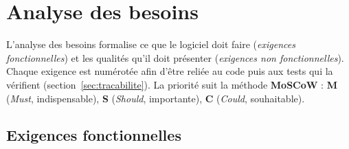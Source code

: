 \documentclass[11pt,a4paper]{report}
\begin{document}
\chapter{Analyse des besoins}

L'analyse des besoins formalise ce que le logiciel doit faire (\emph{exigences
fonctionnelles}) et les qualités qu'il doit présenter (\emph{exigences non
fonctionnelles}). Chaque exigence est numérotée afin d'être reliée au code puis aux
tests qui la vérifient (section~\ref{sec:tracabilite}). La priorité suit la méthode
\textbf{MoSCoW} : \textbf{M} (\emph{Must}, indispensable), \textbf{S} (\emph{Should},
importante), \textbf{C} (\emph{Could}, souhaitable).

\section{Exigences fonctionnelles}
\end{document}
